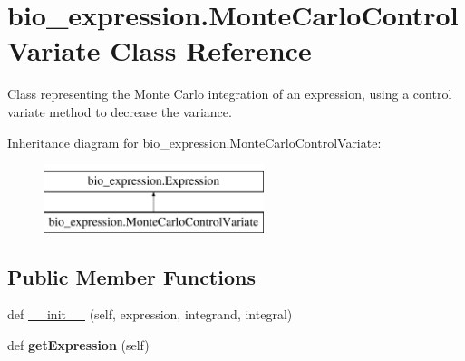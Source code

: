 \hypertarget{classbio__expression_1_1_monte_carlo_control_variate}{}\section{bio\+\_\+expression.\+Monte\+Carlo\+Control\+Variate Class Reference}
\label{classbio__expression_1_1_monte_carlo_control_variate}


Class representing the Monte Carlo integration of an expression, using a control variate method to decrease the variance.  


Inheritance diagram for bio\+\_\+expression.\+Monte\+Carlo\+Control\+Variate\+:\begin{figure}[H]
\begin{center}
\leavevmode
\includegraphics[height=2.000000cm]{classbio__expression_1_1_monte_carlo_control_variate}
\end{center}
\end{figure}
\subsection*{Public Member Functions}
\begin{DoxyCompactItemize}
\item 
def \hyperlink{classbio__expression_1_1_monte_carlo_control_variate_ad90ca664198e027cb2d8fc18ae5bdd78}{\+\_\+\+\_\+init\+\_\+\+\_\+} (self, expression, integrand, integral)
\item 
def {\bfseries get\+Expression} (self)\hypertarget{classbio__expression_1_1_monte_carlo_control_variate_ac125498ad9439236c0132348fc0ce872}{}\label{classbio__expression_1_1_monte_carlo_control_variate_ac125498ad9439236c0132348fc0ce872}

\end{DoxyCompactItemize}
